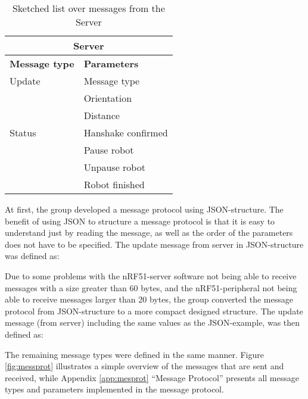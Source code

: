 \begin{table}[ht]
\begin{center}
 \begin{tabular}{|p{60pt} | p{150pt}|} 
 \hline
 \multicolumn{2}{|c|}{\textbf{Server}}\\
 \hline
 \hline
 \textbf{Message type}       &    \textbf{Parameters} \\
 \hline

 Update              &   Message type \\
                    &   Orientation \\
                    &   Distance \\
 \hline
 Status                &   Hanshake confirmed \\
                    &   Pause robot \\
                    &   Unpause robot \\
                    &   Robot finished \\
 \hline
\end{tabular}
\end{center}
\caption{Sketched list over messages from the Server}
\label{tab:messprotfromser}
\end{table}

At first, the group developed a message protocol using JSON-structure. The benefit of using JSON to structure a message protocol is that it is easy to understand just by reading the message, as well as the order of the parameters does not have to be specified. The update message from server in JSON-structure was defined as:


Due to some problems with the nRF51-server software not being able to receive messages with a size greater than 60 bytes, and the nRF51-peripheral not being able to receive messages larger than 20 bytes, the group converted the message protocol from JSON-structure to a more compact designed structure. The update message (from server) including the same values as the JSON-example, was then defined as:


The remaining message types were defined in the same manner. Figure \ref{fig:messprot} illustrates a simple overview of the messages that are sent and received, while Appendix \ref{app:mesprot} ``Message Protocol'' presents all message types and parameters implemented in the message protocol.


